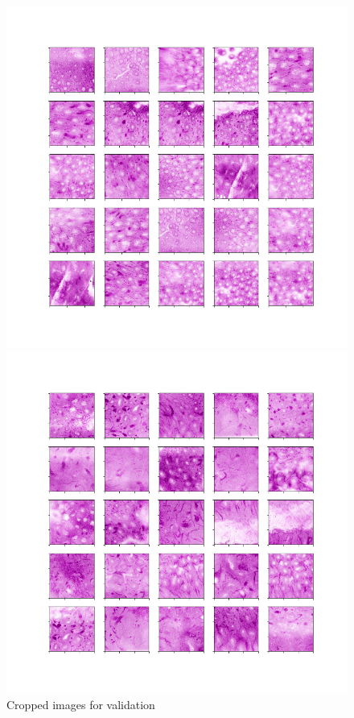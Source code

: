 \begin{figure}[H]
	\begin{minipage}{0.45\columnwidth}
		\centering
		\includegraphics[clip, width=\linewidth]{fig/preprocessing/cropping/HE/normal/C-012}
	\end{minipage}
	\begin{minipage}{0.45\columnwidth}
		\centering
		\includegraphics[clip, width=\linewidth]{fig/preprocessing/cropping/HE/cancer/C-012}
	\end{minipage}
	
	\caption{Cropped images for validation}
	\label{fig:クロップ}
	
\end{figure}

